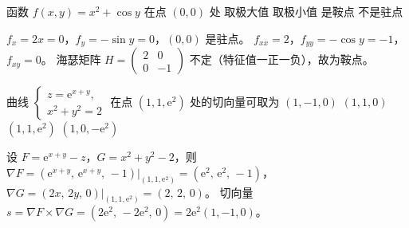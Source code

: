 \documentclass[answer]{THUExam}
\begin{document}
\begin{problem}
函数 $f(x,y)=x^2+\cos y$ 在点 $(0,0)$ 处
\options
{取极大值}
{取极小值}
{是鞍点}
{不是驻点}
\end{problem}
\begin{note}
$f_x=2x=0$，$f_y=-\sin y=0$，$(0,0)$ 是驻点。
$f_{xx}=2$，$f_{yy}=-\cos y=-1$，$f_{xy}=0$。
海瑟矩阵 $H=\begin{pmatrix}2&0\\0&-1\end{pmatrix}$ 不定（特征值一正一负），故为鞍点。
\end{note}
\bigskip

\begin{problem}
曲线 $\begin{cases}z=\mathrm{e}^{x+y},\\x^2+y^2=2\end{cases}$ 在点 $(1,1,\mathrm{e}^{2})$ 处的切向量可取为
\options
{$(1,-1,0)$}
{$(1,1,0)$}
{$(1,1,\mathrm{e}^2)$}
{$(1,0,-\mathrm{e}^2)$}
\end{problem}
\begin{note}
设 $F=\mathrm{e}^{x+y}-z$，$G=x^2+y^2-2$，则
$\nabla F=(\mathrm{e}^{x+y},\,\mathrm{e}^{x+y},\,-1)\big|_{(1,1,\mathrm{e}^2)}=(\mathrm{e}^2,\,\mathrm{e}^2,\,-1)$，
$\nabla G=(2x,\,2y,\,0)\big|_{(1,1,\mathrm{e}^2)}=(2,\,2,\,0)$。
切向量 $s=\nabla F\times\nabla G=(2\mathrm{e}^2,\,-2\mathrm{e}^2,\,0)=2\mathrm{e}^2(1,-1,0)$。
\end{note}
\bigskip

\newpage
{}
\end{document}
